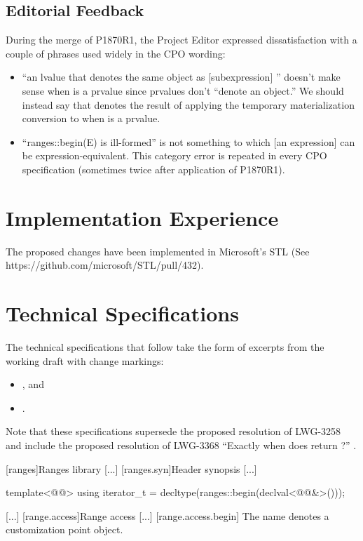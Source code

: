 \section{Editorial Feedback}
During the merge of P1870R1, the Project Editor expressed dissatisfaction
with a couple of phrases used widely in the CPO wording:
\begin{itemize}
\item ``an lvalue  that denotes the same object as [subexpression] ''
  doesn't make sense when  is a prvalue since prvalues don't ``denote an object.''
  We should instead say that  denotes the result of applying
  the temporary materialization conversion to  when  is a prvalue.
\item ``ranges::begin(E) is ill-formed'' is not something
  to which [an expression] can be expression-equivalent.
  This category error is repeated in every CPO specification
  (sometimes twice after application of P1870R1).
\end{itemize}


\chapter{Implementation Experience}
The proposed changes have been implemented in Microsoft's STL (See https://github.com/microsoft/STL/pull/432).


\chapter{Technical Specifications}
The technical specifications that follow take the form of excerpts
from the working draft with change markings:
\begin{itemize}
\item {}, and
\item {}.
\end{itemize}

Note that these specifications supersede the proposed resolution of LWG-3258
and include the proposed resolution of
LWG-3368 ``Exactly when does  return ?'' \cite{lwg3368}.

\setcounter{chapter}{23}
[ranges]{Ranges library}
[...]
\setcounter{section}{1}
[ranges.syn]{Header  synopsis}
[...]
\begin{codeblock}
  template<@@>
    using iterator_t = decltype(ranges::begin(declval<@@&>()));
\end{codeblock}
[...]
[range.access]{Range access}
[...]
[range.access.begin]{}
\pnum
The name  denotes a customization point
object.


